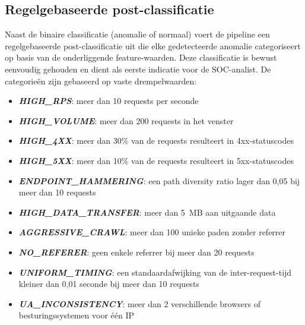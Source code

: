 
\subsection{Regelgebaseerde post-classificatie}
\label{subsec:classificatie-anomalieen}
 
Naast de binaire classificatie (anomalie of normaal) voert de pipeline een regelgebaseerde post-classificatie uit die elke gedetecteerde anomalie categoriseert op basis van de onderliggende feature-waarden. Deze classificatie is bewust eenvoudig gehouden en dient als eerste indicatie voor de SOC-analist. De categorieën zijn gebaseerd op vaste drempelwaarden:
 
\begin{itemize}
    \item \textbf{\textit{HIGH\_RPS}}: meer dan 10 requests per seconde
    \item \textbf{\textit{HIGH\_VOLUME}}: meer dan 200 requests in het venster
    \item \textbf{\textit{HIGH\_4XX}}: meer dan 30\% van de requests resulteert in 4xx-statuscodes
    \item \textbf{\textit{HIGH\_5XX}}: meer dan 10\% van de requests resulteert in 5xx-statuscodes
    \item \textbf{\textit{ENDPOINT\_HAMMERING}}: een path diversity ratio lager dan 0,05 bij meer dan 10 requests
    \item \textbf{\textit{HIGH\_DATA\_TRANSFER}}: meer dan 5~MB aan uitgaande data
    \item \textbf{\textit{AGGRESSIVE\_CRAWL}}: meer dan 100 unieke paden zonder referrer
    \item \textbf{\textit{NO\_REFERER}}: geen enkele referrer bij meer dan 20 requests
    \item \textbf{\textit{UNIFORM\_TIMING}}: een standaardafwijking van de inter-request-tijd kleiner dan 0,01 seconde bij meer dan 10 requests
    \item \textbf{\textit{UA\_INCONSISTENCY}}: meer dan 2 verschillende browsers of besturingssystemen voor één IP
\end{itemize}
 
